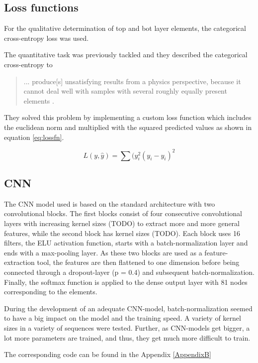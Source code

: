 \subsection{Loss functions}
For the qualitative determination of top and bot layer elements, the categorical cross-entropy loss was used.

The quantitative task was previously tackled and they described the categorical cross-entropy to \begin{quote}
    ... produce[s] unsatisfying results from a physics perspective, because it cannot deal well
with samples with several roughly equally present elements \cite{drera_deep_2019}.
\end{quote}
They solved this problem by implementing a custom loss function which includes the euclidean norm and multiplied with the squared predicted values as shown in equation \ref{eq:lossfn}.

\begin{equation}
\label{eq:lossfn}
    L(y, \hat{y}) = \sum(y_{i}^2 (y_{i} - \hat{y_{i}})^2
\end{equation}




\subsection{CNN}
The CNN model used is based on the standard architecture with two convolutional blocks. The first blocks consist of four consecutive convolutional layers with increasing kernel sizes (TODO) to extract more and more general features, while the second block has kernel sizes (TODO). Each block uses 16 filters, the ELU activation function, starts with a batch-normalization layer and ends with a max-pooling layer.
As these two blocks are used as a feature-extraction tool, the features are then flattened to one dimension before being connected through a dropout-layer (p = 0.4) and subsequent batch-normalization. Finally, the softmax function is applied to the dense output layer with 81 nodes corresponding to the elements.

During the development of an adequate CNN-model, batch-normalization seemed to have a big impact on the model and the training speed. A variety of kernel sizes in a variety of sequences were tested. Further, as CNN-models get bigger, a lot more parameters are trained, and thus, they get much more difficult to train.

The corresponding code can be found in the Appendix \ref{AppendixB}



